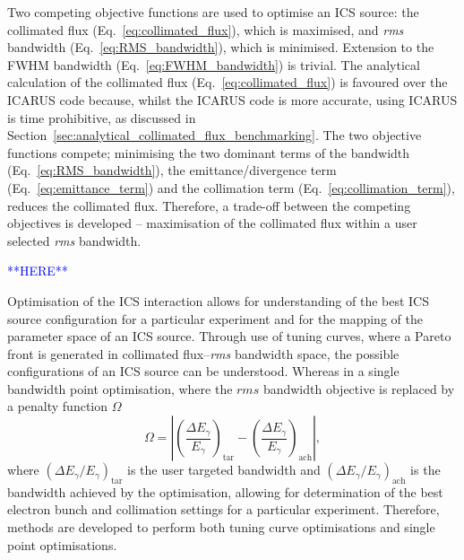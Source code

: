 \documentclass[../main.tex]{subfiles}
\begin{document}
Two competing objective functions are used to optimise an ICS source: the collimated flux (Eq.~\ref{eq:collimated_flux}), which is maximised, and \textit{rms} bandwidth (Eq.~\ref{eq:RMS_bandwidth}), which is minimised. Extension to the FWHM bandwidth (Eq.~\ref{eq:FWHM_bandwidth}) is trivial. The analytical calculation of the collimated flux (Eq.~\ref{eq:collimated_flux}) is favoured over the \textsc{ICARUS} code because, whilst the \textsc{ICARUS} code is more accurate, using \textsc{ICARUS} is time prohibitive, as discussed in Section~\ref{sec:analytical_collimated_flux_benchmarking}. The two objective functions compete; minimising the two dominant terms of the  bandwidth (Eq.~\ref{eq:RMS_bandwidth}), the emittance/divergence term (Eq.~\ref{eq:emittance_term}) and the collimation term (Eq.~\ref{eq:collimation_term}), reduces the collimated flux. Therefore, a trade-off between the competing objectives is developed -- maximisation of the collimated flux within a user selected \textit{rms} bandwidth. 

\textcolor{blue}{**HERE**}

Optimisation of the ICS interaction allows for understanding of the best ICS source configuration for a particular experiment and for the mapping of the parameter space of an ICS source. Through use of tuning curves, where a Pareto front is generated in collimated flux--\textit{rms} bandwidth space, the possible configurations of an ICS source can be understood. Whereas in a single bandwidth point optimisation, where the $\textit{rms}$ bandwidth objective is replaced by a penalty function $\Omega$
\begin{equation}
\Omega = \left|\left(\frac{\Delta E_{\gamma}}{E_{\gamma}}\right)_{\mathrm{tar}}-\left(\frac{\Delta E_{\gamma}}{E_{\gamma}}\right)_{\mathrm{ach}}\right|,
\label{eq:penalty_function}
\end{equation}
where $\left(\Delta E_{\gamma}/E_{\gamma}\right)_{\mathrm{tar}}$ is the user targeted bandwidth and $\left(\Delta E_{\gamma}/E_{\gamma}\right)_{\mathrm{ach}}$ is the bandwidth achieved by the optimisation, allowing for determination of the best electron bunch and collimation settings for a particular experiment. Therefore, methods are developed to perform both tuning curve optimisations and single point optimisations.
\end{document}
